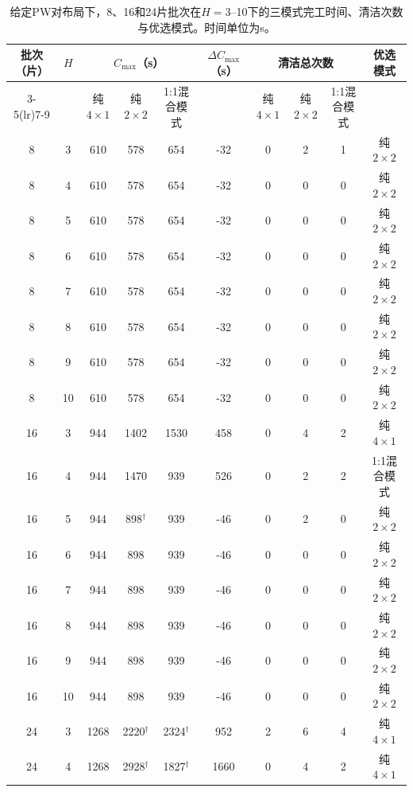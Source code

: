\documentclass[final,5p,times,twocolumn]{elsarticle}
\begin{document}
\begin{table}[tp]
\centering
\scriptsize
\setlength{\tabcolsep}{3pt}
\caption{给定PW对布局下，8、16和24片批次在$H=3$--10下的三模式完工时间、清洁次数与优选模式。时间单位为s。}
\label{tab:clean-crossover-zh}
\begin{tabular}{cccccccccc}
\toprule
\multirow{2}{*}{批次（片）} & \multirow{2}{*}{$H$} & \multicolumn{3}{c}{$C_{\max}$（s）} & \multirow{2}{*}{$\Delta C_{\max}$（s）} & \multicolumn{3}{c}{清洁总次数} & \multirow{2}{*}{优选模式}\\
\cmidrule(lr){3-5}\cmidrule(lr){7-9}
 & & 纯$4\times1$ & 纯$2\times2$ & 1:1混合模式 & & 纯$4\times1$ & 纯$2\times2$ & 1:1混合模式 & \\
\midrule
8 & 3 & 610 & 578 & 654 & -32 & 0 & 2 & 1 & 纯$2\times2$\\
8 & 4 & 610 & 578 & 654 & -32 & 0 & 0 & 0 & 纯$2\times2$\\
8 & 5 & 610 & 578 & 654 & -32 & 0 & 0 & 0 & 纯$2\times2$\\
8 & 6 & 610 & 578 & 654 & -32 & 0 & 0 & 0 & 纯$2\times2$\\
8 & 7 & 610 & 578 & 654 & -32 & 0 & 0 & 0 & 纯$2\times2$\\
8 & 8 & 610 & 578 & 654 & -32 & 0 & 0 & 0 & 纯$2\times2$\\
8 & 9 & 610 & 578 & 654 & -32 & 0 & 0 & 0 & 纯$2\times2$\\
8 & 10 & 610 & 578 & 654 & -32 & 0 & 0 & 0 & 纯$2\times2$\\
\midrule
16 & 3 & 944 & 1402 & 1530 & 458 & 0 & 4 & 2 & 纯$4\times1$\\
16 & 4 & 944 & 1470 & 939 & 526 & 0 & 2 & 2 & 1:1混合模式\\
16 & 5 & 944 & 898$^{\dagger}$ & 939 & -46 & 0 & 2 & 0 & 纯$2\times2$\\
16 & 6 & 944 & 898 & 939 & -46 & 0 & 0 & 0 & 纯$2\times2$\\
16 & 7 & 944 & 898 & 939 & -46 & 0 & 0 & 0 & 纯$2\times2$\\
16 & 8 & 944 & 898 & 939 & -46 & 0 & 0 & 0 & 纯$2\times2$\\
16 & 9 & 944 & 898 & 939 & -46 & 0 & 0 & 0 & 纯$2\times2$\\
16 & 10 & 944 & 898 & 939 & -46 & 0 & 0 & 0 & 纯$2\times2$\\
\midrule
24 & 3 & 1268 & 2220$^{\dagger}$ & 2324$^{\dagger}$ & 952 & 2 & 6 & 4 & 纯$4\times1$\\
24 & 4 & 1268 & 2928$^{\dagger}$ & 1827$^{\dagger}$ & 1660 & 0 & 4 & 2 & 纯$4\times1$\\

\end{tabular}
\end{table}
\end{document}
